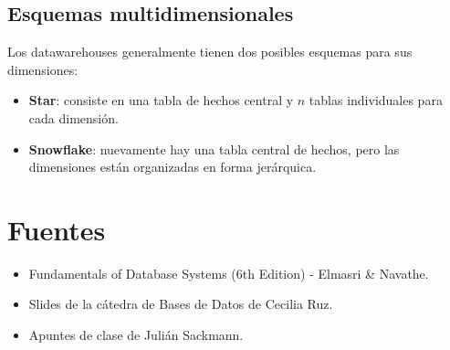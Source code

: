 \documentclass[]{article}
\begin{document}
\subsection{Esquemas multidimensionales}
Los datawarehouses generalmente tienen dos posibles esquemas para sus dimensiones:
\begin{itemize}
    \item \textbf{Star}: consiste en una tabla de hechos central y $n$ tablas individuales para cada dimensión.


    \item \textbf{Snowflake}: nuevamente hay una tabla central de hechos, pero las dimensiones están organizadas en forma jerárquica.


\end{itemize}


\newpage
\section{Fuentes}
\begin{itemize}
    \item Fundamentals of Database Systems (6th Edition) - Elmasri \& Navathe.
    \item Slides de la cátedra de Bases de Datos de Cecilia Ruz.
    \item Apuntes de clase de Julián Sackmann.
\end{itemize}
\end{document}
